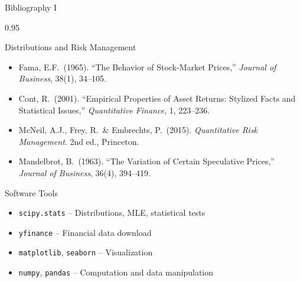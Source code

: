 \documentclass[9pt, aspectratio=169, t]{beamer}
\begin{document}
\begin{frame}{Bibliography I}
    \begin{cminipage}{0.95\textwidth}
    \begin{block}{Distributions and Risk Management}
        {\small
        \begin{itemize}\setlength{\itemsep}{0pt}
            \item Fama, E.F.\ (1965). ``The Behavior of Stock-Market Prices,'' \textit{Journal of Business}, 38(1), 34--105.
            \item Cont, R.\ (2001). ``Empirical Properties of Asset Returns: Stylized Facts and Statistical Issues,'' \textit{Quantitative Finance}, 1, 223--236.
            \item McNeil, A.J., Frey, R.\ \& Embrechts, P.\ (2015). \textit{Quantitative Risk Management}. 2nd ed., Princeton.
            \item Mandelbrot, B.\ (1963). ``The Variation of Certain Speculative Prices,'' \textit{Journal of Business}, 36(4), 394--419.
        \end{itemize}
        }
    \end{block}
    \begin{exampleblock}{Software Tools}
        {\small
        \begin{itemize}\setlength{\itemsep}{0pt}
            \item \texttt{scipy.stats} -- Distributions, MLE, statistical tests
            \item \texttt{yfinance} -- Financial data download
            \item \texttt{matplotlib}, \texttt{seaborn} -- Visualization
            \item \texttt{numpy}, \texttt{pandas} -- Computation and data manipulation
        \end{itemize}
        }
    \end{exampleblock}
    \end{cminipage}
\end{frame}
\end{document}
